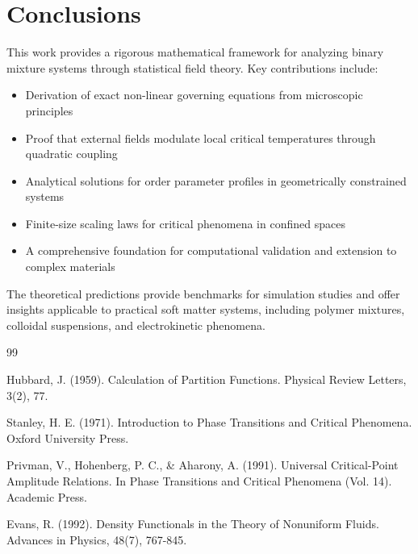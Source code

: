 \documentclass[12pt,a4paper]{article}
\begin{document}
\section{Conclusions}

This work provides a rigorous mathematical framework for analyzing binary mixture systems through statistical field theory. Key contributions include:

\begin{itemize}
    \item Derivation of exact non-linear governing equations from microscopic principles
    \item Proof that external fields modulate local critical temperatures through quadratic coupling
    \item Analytical solutions for order parameter profiles in geometrically constrained systems
    \item Finite-size scaling laws for critical phenomena in confined spaces
    \item A comprehensive foundation for computational validation and extension to complex materials
\end{itemize}

The theoretical predictions provide benchmarks for simulation studies and offer insights applicable to practical soft matter systems, including polymer mixtures, colloidal suspensions, and electrokinetic phenomena.

\begin{thebibliography}{99}

 Hubbard, J. (1959). Calculation of Partition Functions. Physical Review Letters, 3(2), 77.

 Stanley, H. E. (1971). Introduction to Phase Transitions and Critical Phenomena. Oxford University Press.

 Privman, V., Hohenberg, P. C., \& Aharony, A. (1991). Universal Critical-Point Amplitude Relations. In Phase Transitions and Critical Phenomena (Vol. 14). Academic Press.

 Evans, R. (1992). Density Functionals in the Theory of Nonuniform Fluids. Advances in Physics, 48(7), 767-845.

\end{thebibliography}
\end{document}
